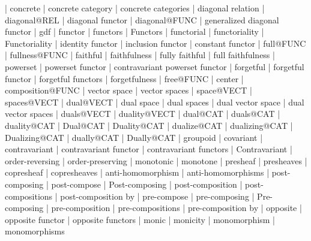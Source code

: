     |   concrete
    |   concrete category
    |   concrete categories
    |   diagonal relation
    |   diagonal@REL
    |   diagonal functor
    |   diagonal@FUNC
    |   generalized diagonal functor
    |   gdf
    |   functor
    |   functors
    |   Functors
    |   functorial
    |   functoriality
    |   Functoriality
    |   identity functor
    |   inclusion functor
    |   constant functor
    |   full@FUNC
    |   fullness@FUNC
    |   faithful
    |   faithfulness
    |   fully faithful
    |   full faithfulness
    |   powerset
    |   powerset functor
    |   contravariant powerset functor
    |   forgetful
    |   forgetful functor
    |   forgetful functors
    |   forgetfulness
    |   free@FUNC
    |   center
    |   composition@FUNC
    |   vector space
    |   vector spaces
    |   space@VECT
    |   spaces@VECT
    |   dual@VECT
    |   dual space
    |   dual spaces
    |   dual vector space
    |   dual vector spaces
    |   duals@VECT
    |   duality@VECT
    |   dual@CAT
    |   duals@CAT
    |   duality@CAT
    |   Dual@CAT
    |   Duality@CAT
    |   dualize@CAT
    |   dualizing@CAT
    |   Dualizing@CAT
    |   dually@CAT
    |   Dually@CAT
    |   groupoid
    |   covariant
    |   contravariant
    |   contravariant functor
    |   contravariant functors
    |   Contravariant
    |   order-reversing
    |   order-preserving
    |   monotonic
    |   monotone
    |   presheaf
    |   presheaves
    |   copresheaf
    |   copresheaves
    |   anti-homomorphism
    |   anti-homomorphisms
    |   post-composing
    |   post-compose
    |   Post-composing
    |   post-composition
    |   post-compositions
    |   post-composition by
    |   pre-compose
    |   pre-composing
    |   Pre-composing
    |   pre-composition
    |   pre-compositions
    |   pre-composition by
    |   opposite
    |   opposite functor
    |   opposite functors
    |   monic
    |   monicity
    |   monomorphism
    |   monomorphisms
